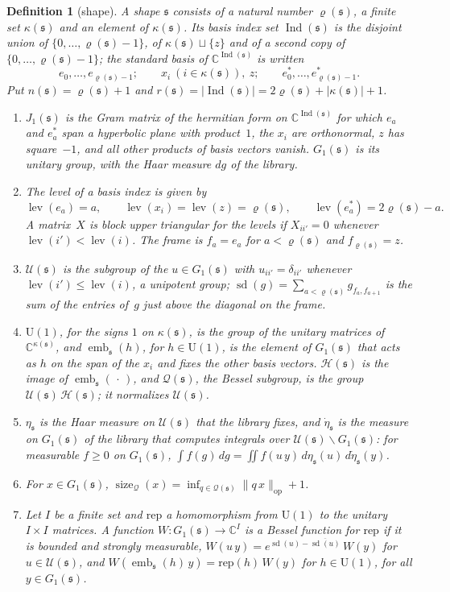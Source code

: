 \documentclass[11pt,a4paper]{article}
\newcommand{\kw}[1]{\emph{#1}}
\newcommand{\m}[1]{\mbox{$#1$}}        %
\theoremstyle{plainx}
\theoremstyle{uprightx}
\newtheorem{definition}[theorem]{Definition}
\newcommand{\CC}{\mathbb{C}}
\newcommand{\fs}{\mathfrak{s}}
\newcommand{\abs}[1]{\lvert #1\rvert}
\newcommand{\op}[1]{\lVert #1\rVert_{\mathrm{op}}}
\newcommand{\Us}[1]{\mathrm{U}(#1)}                      %
\newcommand{\rhs}[1]{\varrho(#1)}                        %
\newcommand{\kps}[1]{\kappa(#1)}                         %
\newcommand{\nsh}[1]{n(#1)}                              %
\newcommand{\rsh}[1]{r(#1)}                              %
\newcommand{\Ind}[1]{\operatorname{Ind}(#1)}             %
\newcommand{\Jone}[1]{J_{1}(#1)}                         %
\newcommand{\Gone}[1]{G_{1}(#1)}                         %
\newcommand{\Uu}[1]{\mathcal{U}(#1)}                     %
\newcommand{\Hh}[1]{\mathcal{H}(#1)}                     %
\newcommand{\Qq}[1]{\mathcal{Q}(#1)}                     %
\newcommand{\emb}[2]{\operatorname{emb}_{#1}(#2)}        %
\newcommand{\sd}[1]{\operatorname{sd}(#1)}               %
\newcommand{\lev}[1]{\operatorname{lev}(#1)}             %
\newcommand{\hU}[1]{\eta_{#1}}                           %
\newcommand{\hq}[1]{\dot\eta_{#1}}                       %
\newcommand{\bsz}[1]{\operatorname{size}_{\mathcal{Q}}(#1)}  %
\begin{document}
\begin{definition}[shape]\label{d:shape}
A \kw{shape} $\fs$ consists of a natural number $\rhs{\fs}$, a finite set $\kps{\fs}$ and an element of
$\kps{\fs}$. Its \kw{basis index set} $\Ind{\fs}$ is the disjoint union of \m{\{0,\dots,\rhs{\fs}-1\}}, of
\m{\kps{\fs}\sqcup\{z\}} and of a second copy of \m{\{0,\dots,\rhs{\fs}-1\}}; the standard basis of
$\CC^{\Ind{\fs}}$ is written
\[e_0,\dots,e_{\rhs{\fs}-1};\qquad x_i\ (i\in\kps{\fs}),\ z;\qquad e^{*}_0,\dots,e^{*}_{\rhs{\fs}-1}.\]
Put \m{\nsh{\fs}=\rhs{\fs}+1} and $\rsh{\fs}=\abs{\Ind{\fs}}=2\rhs{\fs}+\abs{\kps{\fs}}+1$.
\begin{enumerate}[label=\textup{(\alph*)},leftmargin=2.3em,itemsep=1pt]
\item $\Jone{\fs}$ is the Gram matrix of the hermitian form on $\CC^{\Ind{\fs}}$ for which $e_a$ and $e^{*}_a$ span
  a hyperbolic plane with product~$1$, the $x_i$ are orthonormal, $z$ has square~$-1$, and all other products of
  basis vectors vanish. $\Gone{\fs}$ is its unitary group, with the Haar measure $dg$ of the library.
\item The \kw{level} of a basis index is given by
  \[\lev{e_a}=a,\qquad\lev{x_i}=\lev{z}=\rhs{\fs},\qquad\lev{e^{*}_a}=2\rhs{\fs}-a.\]
  A matrix~$X$ is \kw{block upper triangular for the levels} if \m{X_{ii'}=0} whenever
  \m{\lev{i'}<\lev{i}}. The \kw{frame} is \m{f_a=e_a} for \m{a<\rhs{\fs}} and \m{f_{\rhs{\fs}}=z}.
\item $\Uu{\fs}$ is the subgroup of the \m{u\in\Gone{\fs}} with \m{u_{ii'}=\delta_{ii'}} whenever
  \m{\lev{i'}\le\lev{i}}, a unipotent group; $\sd{g}=\sum_{a<\rhs{\fs}}g_{f_a,f_{a+1}}$ is the sum of the entries
  of~$g$ just above the diagonal on the frame.
\item $\Us{1}$, for the signs $1$ on $\kps{\fs}$, is the group of the unitary matrices of $\CC^{\kps{\fs}}$, and
  $\emb{\fs}{h}$, for \m{h\in\Us{1}}, is the element of $\Gone{\fs}$ that acts as $h$ on the span of the $x_i$ and
  fixes the other basis vectors. $\Hh{\fs}$ is the image of $\emb{\fs}{\,\cdot\,}$, and $\Qq{\fs}$, the \kw{Bessel
  subgroup}, is the group \m{\Uu{\fs}\,\Hh{\fs}}; it normalizes $\Uu{\fs}$.
\item $\hU{\fs}$ is the Haar measure on $\Uu{\fs}$ that the library fixes, and $\hq{\fs}$ is the measure on
  $\Gone{\fs}$ of the library that computes integrals over \m{\Uu{\fs}\backslash\Gone{\fs}}: for measurable
  \m{f\ge0} on $\Gone{\fs}$, $\int f(g)\,dg=\iint f(u\,y)\,d\hU{\fs}(u)\,d\hq{\fs}(y)$.
\item For \m{x\in\Gone{\fs}}, $\bsz{x}=\inf_{q\in\Qq{\fs}}\op{q\,x}+1$.
\item Let $I$ be a finite set and $\mathrm{rep}$ a homomorphism from $\Us{1}$ to the unitary \m{I\times I}
  matrices. A function \m{W\colon\Gone{\fs}\to\CC^{I}} is a \kw{Bessel function for $\mathrm{rep}$} if it is bounded
  and strongly measurable, $W(u\,y)=e^{\sd{u}-\overline{\sd{u}}}\,W(y)$ for \m{u\in\Uu{\fs}}, and
  $W(\emb{\fs}{h}\,y)=\mathrm{rep}(h)\,W(y)$ for \m{h\in\Us{1}}, for all \m{y\in\Gone{\fs}}.
\end{enumerate}
\end{definition}
\end{document}
